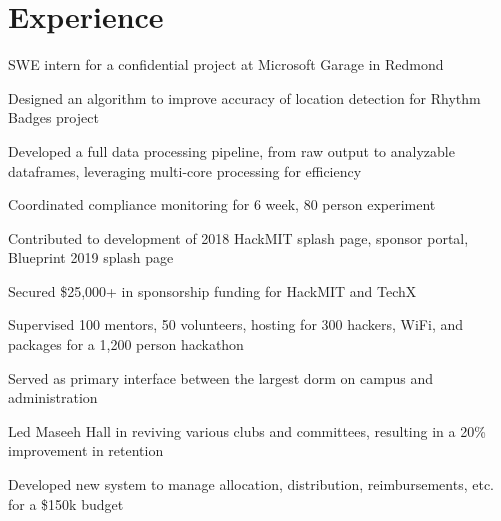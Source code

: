 \documentclass[]{deedy-resume-openfont}
\begin{document}
\section{Experience}
\hfill {}
\begin{tightemize}
    \item SWE intern for a confidential project at Microsoft Garage in Redmond
\end{tightemize}
\sectionsep
{}\hfill {}
\begin{tightemize}
	\item Designed an algorithm to improve accuracy of location detection for Rhythm Badges project
	\item Developed a full data processing pipeline, from raw output to analyzable dataframes, leveraging multi-core processing for efficiency
	\item Coordinated compliance monitoring for 6 week, 80 person experiment
\end{tightemize}
\sectionsep
{}\hfill {}
\begin{tightemize}
	\item Contributed to development of 2018 HackMIT splash page, sponsor portal, Blueprint 2019 splash page
	\item Secured \$25,000+ in sponsorship funding for HackMIT and TechX
	\item Supervised 100 mentors, 50 volunteers, hosting for 300 hackers, WiFi, and packages for a 1,200 person hackathon
\end{tightemize}
\sectionsep
{}\hfill {}
\begin{tightemize}
    \item Served as primary interface between the largest dorm on campus and administration
    \item Led Maseeh Hall in reviving various clubs and committees, resulting in a 20\% improvement in retention
	\item Developed new system to manage allocation, distribution, reimbursements, etc. for a \$150k budget
\end{tightemize}
\sectionsep
\end{document}
